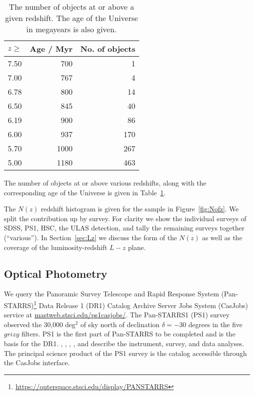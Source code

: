 \documentclass[usenatbib]{mnras}
\begin{document}
\begin{table}
\centering
\begin{tabular}{l r  r}
\hline \hline
$z \geq$  & Age / Myr & No. of objects \\
\hline 
7.50         &    700         &   1   \\
7.00         &    767         &   4   \\
6.78         &    800         &  14   \\
6.50         &    845         &  40   \\
6.19         &   900          &  86   \\
6.00         &   937          &  170   \\
5.70         & 1000          &  267   \\
5.00         & 1180          &  463   \\
\hline \hline
\end{tabular}
\caption{The number of objects at or above a given redshift. 
The age of the Universe in megayears is also given. }
      \label{tab:ages}
\end{table}

The number of objects at or above various redshifts, along with the 
corresponding age of the Universe is given in Table~\ref{tab:ages}. 

The $N(z)$ redshift histogram is given for the sample in Figure~\ref{fig:Nofz}. 
We split the contribution up by survey. For clarity we show the individual 
surveys of SDSS, PS1, HSC, the ULAS detection, and tally the remaining 
surveys together (``various''). In Section~\ref{sec:Lz} we discuss the form 
of the $N(z)$ as well as the coverage of the luminosity-redshift $L-z$ plane. 

        
\subsection{Optical Photometry}
We query the Panoramic Survey Telescope and Rapid Response System (Pan-STARRS)\footnote{\href{https://outerspace.stsci.edu/display/PANSTARRS}{https://outerspace.stsci.edu/display/PANSTARRS}} Data Release 1 (DR1) Catalog Archive Server Jobs System (CasJobs) service at \href{http://mastweb.stsci.edu/ps1casjobs/}{mastweb.stsci.edu/ps1casjobs/}. The Pan-STARRS1 (PS1) survey observed the 30,000 deg$^{2}$ of sky north of declination $\delta = -30$ degrees in the five $grizy$ filters. PS1 is the first part of Pan-STARRS to be completed and is the basis for the DR1. \citet{Chambers2016}, \citet{Magnier2016a}, \citet{Waters2016}, \citet{Magnier2016b}, \citet{Magnier2016c} and \citet{Flewelling2016} describe the instrument, survey, and data analyses. The principal science product of the PS1 survey is the catalog accessible through the CasJobs interface.
\end{document}
